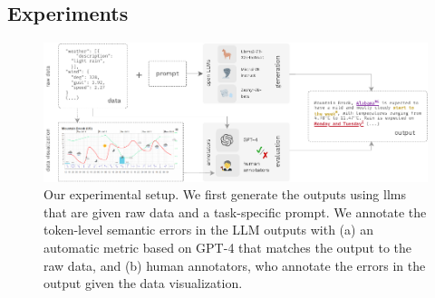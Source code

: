 


\subsection{Experiments}
\label{sec:quintd:experiments}

\begin{figure}[t]
    \centering
    \includegraphics[width=\textwidth]{img/quintd_process.pdf}
    \caption{Our experimental setup. We first generate the outputs using \acp{llm} that are given raw data and a task-specific prompt. We annotate the token-level semantic errors in the LLM outputs with (a) an automatic metric based on GPT-4 that matches the output to the raw data, and (b) human annotators, who annotate the errors in the output given the data visualization.}\label{fig:quintd:process}
\end{figure}

